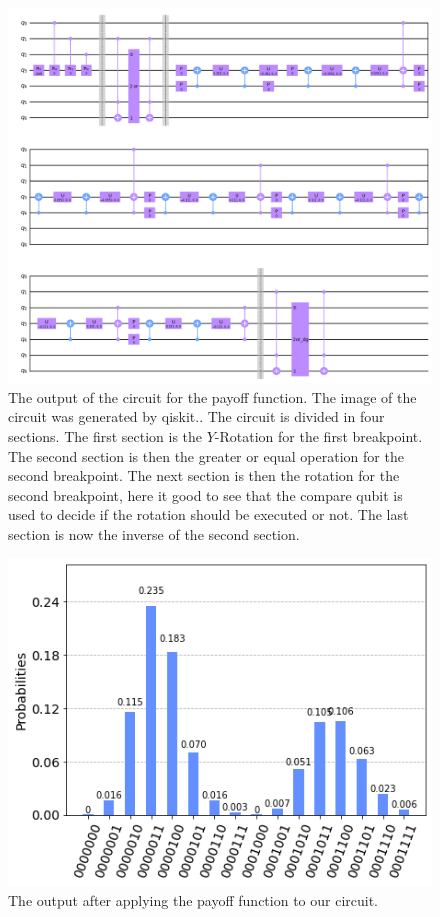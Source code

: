 \documentclass[a4paper, 12pt, one column, aas_macros]{article}
\begin{document}
\begin{figure}[H]
  \begin{center}
    \includegraphics[width=\linewidth]{images/model.png}
  \end{center}
  \caption{The output of the circuit for the payoff function. The image of the circuit was generated by qiskit.\cite{Qiskit}. The circuit is divided in four sections. The first section is the $Y$-Rotation for the first breakpoint. The second section is then the greater or equal operation for the second breakpoint. The next section is then the rotation for the second breakpoint, here it good to see that the compare qubit is used to decide if the rotation should be executed or not. The last section is now the inverse of the second section.}
  \label{fig:E_model_payoff_function}
\end{figure}

 \begin{figure}[H]
  \begin{center}
    \includegraphics[width=0.5\linewidth]{images/probability_estimate.png}
  \end{center}
  \caption{The output after applying the payoff function to our circuit.}
  \label{fig:E_probability_estimate}
\end{figure}
\end{document}
